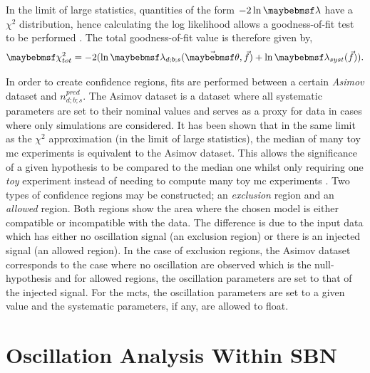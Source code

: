 In the limit of large statistics, quantities of the form $-2\lnOf{\lambda}$ have a $\chi^2$ distribution, hence calculating the log likelihood allows a goodness-of-fit test to be performed \cite{introduction_to_mathematical_statistics_book}. The total goodness-of-fit value is therefore given by,
\begin{equation}
    \chi^2_{tot} = -2(\lnOf{\lambda_{d;b;s}(\vec{\theta}, \vec{f})} + \lnOf{\lambda_{syst}(\vec{f})}).
\end{equation}

In order to create confidence regions, fits are performed between a certain \textit{Asimov} dataset and $n_{d;b;s}^{pred}$. The Asimov dataset is a dataset where all systematic parameters are set to their nominal values and serves as a proxy for data in cases where only simulations are considered. It has been shown that in the same limit as the $\chi^2$ approximation (in the limit of large statistics), the median of many toy \gls{mc} experiments is equivalent to the Asimov dataset. This allows the significance of a given hypothesis to be compared to the median one whilst only requiring one \textit{toy} experiment instead of needing to compute many toy \gls{mc} experiments \cite{Asimov_dataset}. Two types of confidence regions may be constructed; an \textit{exclusion} region and an \textit{allowed} region. Both regions show the area where the chosen model is either compatible or incompatible with the data. The difference is due to the input data which has either no oscillation signal (an exclusion region) or there is an injected signal (an allowed region). In the case of exclusion regions, the Asimov dataset corresponds to the case where no oscillation are observed which is the null-hypothesis and for allowed regions, the oscillation parameters are set to that of the injected signal. For the \glspl{mct}, the oscillation parameters are set to a given value and the systematic parameters, if any, are allowed to float.

\section{Oscillation Analysis Within SBN}


